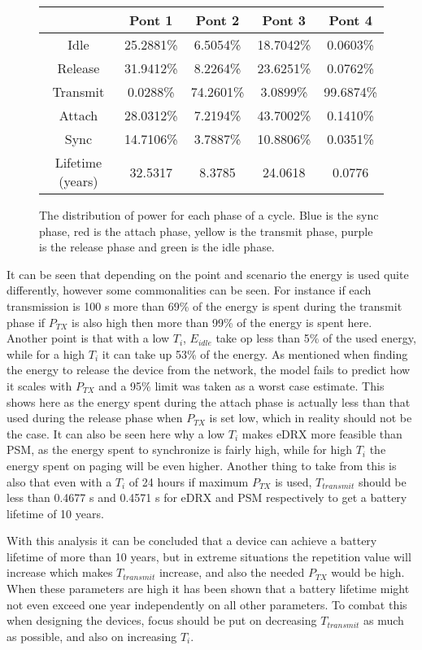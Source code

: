 \begin{figure}[H]
\begin{minipage}{0.48\textwidth}
\begin{table}[H]
{\begin{tabular}{|c|c|c|c|c|}
 & Pont 1	& Pont 2	& Pont 3	& Pont 4	\\ \hline
\cellcolor{mycolor5}Idle	& 25.2881\% 	& 6.5054\%	& 18.7042\%	& 0.0603\%\\ \hline
\cellcolor{mycolor4}Release	& 31.9412\% 	& 8.2264\%	& 23.6251\%	& 0.0762\%\\ \hline
\cellcolor{mycolor3}Transmit	& 0.0288\% 	& 74.2601\%	& 3.0899\%	& 99.6874\%\\ \hline
\cellcolor{mycolor2}Attach	& 28.0312\% 	& 7.2194\%	& 43.7002\%	& 0.1410\%\\ \hline
\cellcolor{mycolor1}Sync	& 14.7106\% 	& 3.7887\%	& 10.8806\%	& 0.0351\%\\ \hline
Lifetime (years)	& 32.5317 	& 8.3785	& 24.0618	& 0.0776\\ \hline
\end{tabular}}
\end{table}
\end{minipage}
\caption{The distribution of power for each phase of a cycle. Blue is the sync phase, red is the attach phase, yellow is the transmit phase, purple is the release phase and green is the idle phase.}
\label{fig:barplot_plots}
\end{figure}

It can be seen that depending on the point and scenario the energy is used quite differently, however some commonalities can be seen. For instance if each transmission is 100 s more than 69\% of the energy is spent during the transmit phase if $P_{TX}$ is also high then more than 99\% of the energy is spent here. Another point is that with a low $T_i$, $E_{idle}$ take op less than 5\% of the used energy, while for a high $T_i$ it can take up 53\% of the energy. As mentioned when finding the energy to release the device from the network, the model fails to predict how it scales with $P_{TX}$ and a 95\% limit was taken as a worst case estimate. This shows here as the energy spent during the attach phase is actually less than that used during the release phase when $P_{TX}$ is set low, which in reality should not be the case. It can also be seen here why a low $T_i$ makes eDRX more feasible than PSM, as the energy spent to synchronize is fairly high, while for high $T_i$ the energy spent on paging will be even higher. Another thing to take from this is also that even with a $T_i$ of 24 hours if maximum $P_{TX}$ is used, $T_{transmit}$ should be less than 0.4677 s and 0.4571 s for eDRX and PSM respectively to get a battery lifetime of 10 years. 


With this analysis it can be concluded that a device can achieve a battery lifetime of more than 10 years, but in extreme situations the repetition value will increase which makes $T_{transmit}$ increase, and also the needed $P_{TX}$ would be high. When these parameters are high it has been shown that a battery lifetime might not even exceed one year independently on all other parameters. To combat this when designing the devices, focus should be put on decreasing $T_{transmit}$ as much as possible, and also on increasing $T_i$. 
